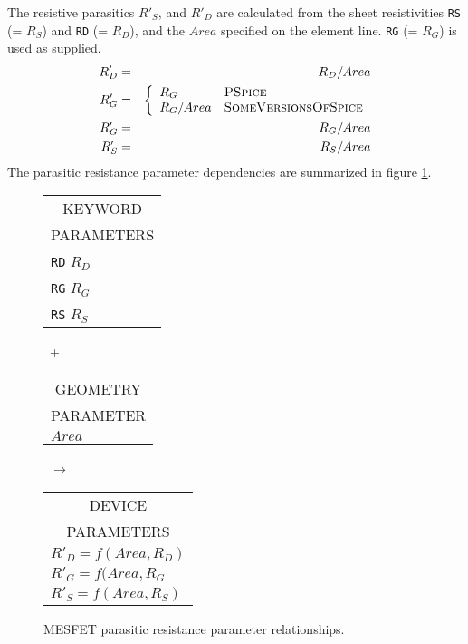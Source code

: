 The resistive parasitics
$R'_S$, and $R'_D$ are calculated from the sheet resistivities
{\tt RS} (= $R_S$) and {\tt RD} (= $R_D$), and the
$Area$ specified on the element line.
{\tt RG} (= $R_G$) is used as supplied.
\begin{eqnarray}
R'_D & = & R_D/Area\\
R'_G & = & \left\{ \begin{array}{ll}
                          R_G      & \mbox{\pspice}\\
                          R_G/Area & \mbox{\sspice}\\\end{array}\right. \\ %
R'_G & = & R_G/Area
\\
R'_S & = & R_S/Area
\end{eqnarray}
The parasitic resistance parameter dependencies are summarized in
figure \ref{b5para}.
\begin{figure}[h]
\parbox[t]{1.3in}{
\begin{tabular}[t]{|p{1in}|}
\hline
\multicolumn{1}{|c|}{KEYWORD} \\
\multicolumn{1}{|c|}{PARAMETERS} \\
\hline
\hline
{\tt RD} \hfill $R_D$\\
{\tt RG} \hfill $R_G$\\
{\tt RS} \hfill $R_S$\\
\hline
\end{tabular}
}
\hfill
\parbox{0.2in}{\ \vspace*{0.2in}\newline +}
\hfill
\begin{tabular}[t]{|p{1in}|}
\hline
\multicolumn{1}{|c|}{GEOMETRY} \\
\multicolumn{1}{|c|}{PARAMETER} \\
\hline
$Area$\\
\hline
\end{tabular}
\hfill
\parbox{0.2in}{\ \vspace*{0.2in}\newline $\rightarrow$}
\hfill
\begin{tabular}[t]{|p{1.8in}|}
\hline
\multicolumn{1}{|c|}{DEVICE}\\
\multicolumn{1}{|c|}{PARAMETERS}\\
\hline
\hspace*{\fill} $R'_D = f(Area, R_D)$\\
\hspace*{\fill} $R'_G = f(Area, R_G$\\
\hspace*{\fill} $R'_S = f(Area, R_S)$\\
\hline
\end{tabular}
\caption{MESFET parasitic resistance parameter
relationships. \label{b5para}}
\end{figure}

